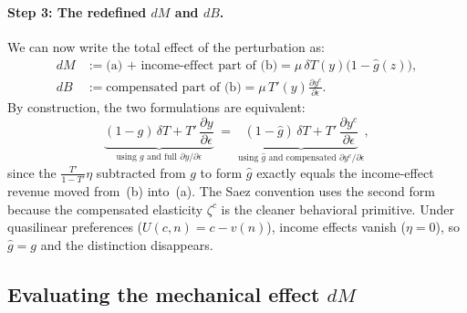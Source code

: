 \documentclass[12pt,a4paper]{article}
\theoremstyle{definition}
\theoremstyle{plain}
\theoremstyle{remark}
\begin{document}
\paragraph{Step 3: The redefined $dM$ and $dB$.}
We can now write the total effect of the perturbation as:
\begin{align}
dM &:= \text{(a) + income-effect part of (b)}
= \mu\,\delta T(y)\bigl(1-\hat g(z)\bigr),
\label{eq:dM-lagrangian-1D}
\\
dB &:= \text{compensated part of (b)}
= \mu\,T'(y)\frac{\partial y^c}{\partial\epsilon}.
\label{eq:dB-lagrangian-1D}
\end{align}
By construction, the two formulations are equivalent:
\[
\underbrace{(1-g)\,\delta T + T'\,\frac{\partial y}{\partial\epsilon}}_{\text{using }g\text{ and full }\partial y/\partial\epsilon}
\;=\;
\underbrace{(1-\hat g)\,\delta T + T'\,\frac{\partial y^c}{\partial\epsilon}}_{\text{using }\hat g\text{ and compensated }\partial y^c/\partial\epsilon},
\]
since the $\frac{T'}{1-T'}\eta$ subtracted from $g$ to
form $\hat g$ exactly equals the income-effect revenue moved
from~(b) into~(a). The Saez convention uses the second form
because the compensated elasticity $\zeta^c$ is the cleaner
behavioral primitive. Under quasilinear preferences
($U(c,n)=c-v(n)$), income effects vanish ($\eta=0$), so
$\hat g = g$ and the distinction disappears.

\subsection{Evaluating the mechanical effect $dM$}
\end{document}
